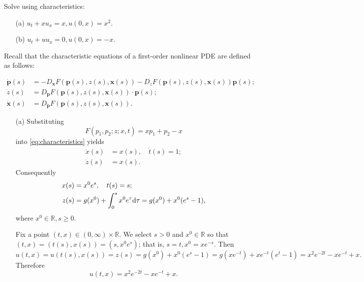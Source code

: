 \begin{pro}
  Solve using characteristics:
  \begin{itemize}
  \item[(a) ]
    $u_t + xu_x = x, u(0, x) = x^2$.
  \item[(b) ]
    $u_t + uu_x = 0, u(0, x) = -x$.
  \end{itemize}
\end{pro}

\begin{sol}
  Recall that the characteristic equations of
a first-order nonlinear PDE are defined as follows:
\begin{defn}
  \begin{subequations}
    \label{eq:characteristics}
    \begin{align}
      \dot{\mathbf{p}}(s) &= -D_{\mathbf{x}}F(\mathbf{p}(s), z(s), \mathbf{x}(s)) -
      D_z F(\mathbf{p}(s), z(s), \mathbf{x}(s))\mathbf{p}(s); \\
      \dot{z}(s) &= D_{\mathbf{p}}F(\mathbf{p}(s), z(s), \mathbf{x}(s))\cdot\mathbf{p}(s); \\
      \dot{\mathbf{x}}(s) &= D_{\mathbf{p}}F(\mathbf{p}(s), z(s), \mathbf{x}(s)).
    \end{align}
  \end{subequations}
\end{defn}

\begin{itemize}
\item[(a) ]
  Substituting
  \begin{displaymath}
    F(p_1, p_2; z; x, t) = xp_1 + p_2 - x
  \end{displaymath}
  into \eqref{eq:characteristics} yields
  \begin{align*}
    \dot{x}(s) &= x(s), \quad \dot{t}(s) = 1; \\
    \dot{z}(s) &= x(s).
  \end{align*}
  Consequently
  \begin{align*}
    x(s) &= x^0e^s, \quad t(s) = s; \\
    z(s) &= g(x^0) + \int_0^sx^0e^{\tau}\mathrm{d}\tau = g(x^0) + x^0(e^s-1),
  \end{align*}
  where $x^0\in\mathbb{R}, s\geq 0$.

  Fix a point $(t, x)\in(0, \infty)\times\mathbb{R}$.
  We select $s>0$ and $x^0\in\mathbb{R}$ so that
  $(t, x) = (t(s), x(s)) = (s, x^0e^s)$;
  that is,
  $s = t, x^0 = xe^{-s}$.
  Then
  \begin{displaymath}
    u(t, x) = u(t(s), x(s)) = z(s) = g(x^0) + x^0(e^s - 1) = g(xe^{-t}) + xe^{-t}(e^t-1) = x^2e^{-2t} - xe^{-t} +x.
  \end{displaymath}
  Therefore
  \begin{equation}
    u(t, x) = x^2e^{-2t} - xe^{-t} + x.
  \end{equation}


\end{itemize}
\end{sol}
